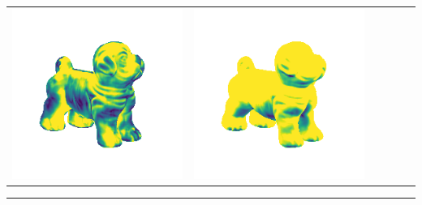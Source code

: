 \begin{tabularx}{\linewidth}{@{}Y@{}Y@{}Y@{}Y@{}Y@{}Y@{}}
\includegraphics[width=\linewidth]{semisynthetic/20160617_17_marrnet_err.png} &
\includegraphics[width=\linewidth]{semisynthetic/20160617_17_ef_err.png} \\
\end{tabularx}
\begin{center}\rule{0.5\linewidth}{\linethickness}\end{center}

